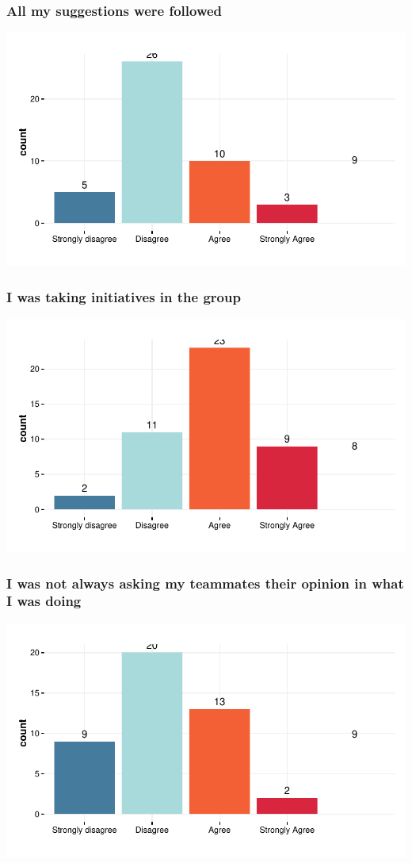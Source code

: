 \documentclass{article}
\begin{document}
\subsubsection{All my suggestions were followed}
\includegraphics{Raw_num/plots/-plot_suggestions_followed}

\subsubsection{I was taking initiatives in the group}
\includegraphics{Raw_num/plots/-plot_take_initiatives}


\subsubsection{I was not always asking my teammates their opinion in what I was doing}
\includegraphics{Raw_num/plots/-plot_solo_worker}
\end{document}
